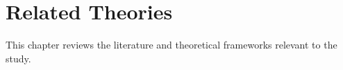 \chapter{Related Theories}
This chapter reviews the literature and theoretical frameworks relevant to the study.